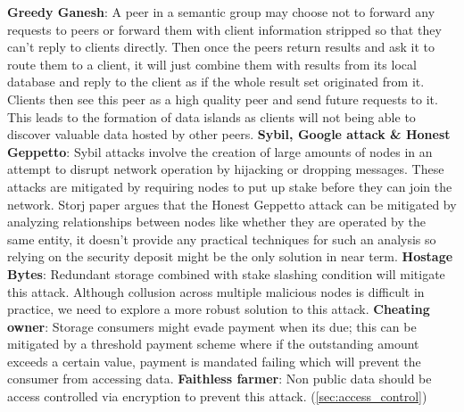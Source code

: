 \newline\newline
\textbf{Greedy Ganesh}: A peer in a semantic group may choose not to forward any requests to peers or forward them with client information stripped so that they can't reply to clients directly. Then once the peers return results and ask it to route them to a client, it will just combine them with results from its local database and reply to the client as if the whole result set originated from it. Clients then see this peer as a high quality peer and send future requests to it. This leads to the formation of data islands as clients will not being able to discover valuable data hosted by other peers.
\newline\newline
\textbf{Sybil, Google attack \& Honest Geppetto}: Sybil attacks involve the creation of large amounts of nodes in an attempt to disrupt network operation by hijacking or dropping messages. These attacks are mitigated by requiring nodes to put up stake before they can join the network. Storj paper argues that the Honest Geppetto attack can be mitigated by analyzing relationships between nodes like whether they are operated by the same entity, it doesn't provide any practical techniques for such an analysis so relying on the security deposit might be the only solution in near term.
\newline\newline
\textbf{Hostage Bytes}: Redundant storage combined with stake slashing condition will mitigate this attack. Although collusion across multiple malicious nodes is difficult in practice, we need to explore a more robust solution to this attack.
\newline\newline
\textbf{Cheating owner}: Storage consumers might evade payment when its due; this can be mitigated by a threshold payment scheme where if the outstanding amount exceeds a certain value, payment is mandated failing which will prevent the consumer from accessing data.
\newline\newline
\textbf{Faithless farmer}: Non public data should be access controlled via encryption to prevent this attack. (\cref{sec:access_control}) 